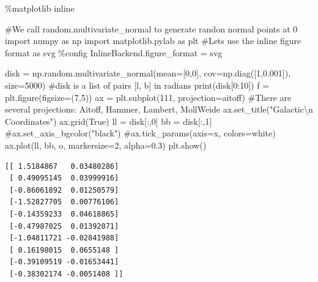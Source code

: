 \documentclass[
  letterpaper,
  DIV=11,
  numbers=noendperiod]{scrreprt}
\newenvironment{Shaded}{\begin{snugshade}}{\end{snugshade}}
\newcommand{\BuiltInTok}[1]{\textcolor[rgb]{0.00,0.23,0.31}{#1}}
\newcommand{\CharTok}[1]{\textcolor[rgb]{0.13,0.47,0.30}{#1}}
\newcommand{\CommentTok}[1]{\textcolor[rgb]{0.37,0.37,0.37}{#1}}
\newcommand{\DecValTok}[1]{\textcolor[rgb]{0.68,0.00,0.00}{#1}}
\newcommand{\FloatTok}[1]{\textcolor[rgb]{0.68,0.00,0.00}{#1}}
\newcommand{\ImportTok}[1]{\textcolor[rgb]{0.00,0.46,0.62}{#1}}
\newcommand{\NormalTok}[1]{\textcolor[rgb]{0.00,0.23,0.31}{#1}}
\newcommand{\OperatorTok}[1]{\textcolor[rgb]{0.37,0.37,0.37}{#1}}
\newcommand{\StringTok}[1]{\textcolor[rgb]{0.13,0.47,0.30}{#1}}
\newcommand{\VariableTok}[1]{\textcolor[rgb]{0.07,0.07,0.07}{#1}}
\begin{document}
\begin{Shaded}
\begin{Highlighting}[]
\OperatorTok{\%}\NormalTok{matplotlib inline}

\CommentTok{\#We call random.multivariate\_normal to generate randon normal points at 0}
\ImportTok{import}\NormalTok{ numpy }\ImportTok{as}\NormalTok{ np}
\ImportTok{import}\NormalTok{ matplotlib.pylab }\ImportTok{as}\NormalTok{ plt}
\CommentTok{\#Lets use the inline figure format as svg}
\OperatorTok{\%}\NormalTok{config InlineBackend.figure\_format }\OperatorTok{=} \StringTok{\textquotesingle{}svg\textquotesingle{}}

\NormalTok{disk }\OperatorTok{=}\NormalTok{ np.random.multivariate\_normal(mean}\OperatorTok{=}\NormalTok{[}\DecValTok{0}\NormalTok{,}\DecValTok{0}\NormalTok{], cov}\OperatorTok{=}\NormalTok{np.diag([}\DecValTok{1}\NormalTok{,}\FloatTok{0.001}\NormalTok{]), size}\OperatorTok{=}\DecValTok{5000}\NormalTok{)}
\CommentTok{\#disk is a list of pairs [l, b] in radians}
\BuiltInTok{print}\NormalTok{(disk[}\DecValTok{0}\NormalTok{:}\DecValTok{10}\NormalTok{])}
\NormalTok{f }\OperatorTok{=}\NormalTok{ plt.figure(figsize}\OperatorTok{=}\NormalTok{(}\DecValTok{7}\NormalTok{,}\DecValTok{5}\NormalTok{))}
\NormalTok{ax }\OperatorTok{=}\NormalTok{ plt.subplot(}\DecValTok{111}\NormalTok{, projection}\OperatorTok{=}\StringTok{\textquotesingle{}aitoff\textquotesingle{}}\NormalTok{)}
\CommentTok{\#There are several projections: Aitoff, Hammer, Lambert, MollWeide}
\NormalTok{ax.set\_title(}\StringTok{"Galactic}\CharTok{\textbackslash{}n}\StringTok{ Coordinates"}\NormalTok{)}
\NormalTok{ax.grid(}\VariableTok{True}\NormalTok{)}
\NormalTok{ll }\OperatorTok{=}\NormalTok{ disk[:,}\DecValTok{0}\NormalTok{]}
\NormalTok{bb }\OperatorTok{=}\NormalTok{ disk[:,}\DecValTok{1}\NormalTok{]}
\CommentTok{\#ax.set\_axis\_bgcolor("black")}
\CommentTok{\#ax.tick\_params(axis=\textquotesingle{}x\textquotesingle{}, colors=\textquotesingle{}white\textquotesingle{})}
\NormalTok{ax.plot(ll, bb, }\StringTok{\textquotesingle{}o\textquotesingle{}}\NormalTok{, markersize}\OperatorTok{=}\DecValTok{2}\NormalTok{, alpha}\OperatorTok{=}\FloatTok{0.3}\NormalTok{)}
\NormalTok{plt.show()}
\end{Highlighting}
\end{Shaded}

\begin{verbatim}
[[ 1.5184867   0.03480286]
 [ 0.49095145  0.03999916]
 [-0.86061892  0.01250579]
 [-1.52827705  0.00776106]
 [-0.14359233  0.04618865]
 [-0.47987025  0.01392071]
 [-1.04811721 -0.02841988]
 [ 0.16198015  0.0655148 ]
 [-0.39109519 -0.01653441]
 [-0.38302174 -0.0051408 ]]
\end{verbatim}
\end{document}
